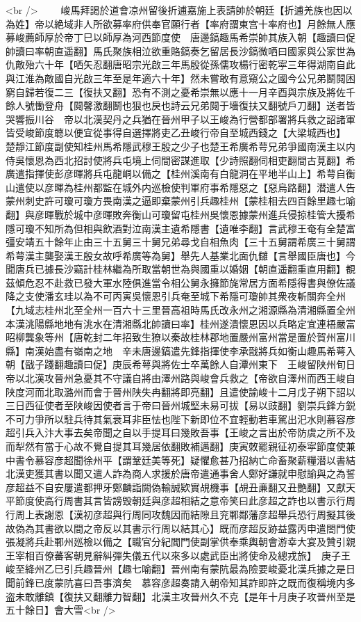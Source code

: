 <br />
　　峻馬拜謁於道會凉州留後折逋嘉施上表請帥於朝廷【折逋羌族也因以為姓】帝以絶域非人所欲募率府供奉官願行者【率府謂東宫十率府也】月餘無人應募峻薦師厚於帝丁巳以師厚為河西節度使　唐邊鎬趣馬希崇帥其族入朝【趣讀曰促帥讀曰率朝直遥翻】馬氏聚族相泣欲重賂鎬奏乞留居長沙鎬微哂曰國家與公家世為仇敵殆六十年【哂矢忍翻唐昭宗光啟三年馬殷從孫儒攻楊行密乾寜三年得湖南自此與江淮為敵國自光啟三年至是年適六十年】然未嘗敢有意窺公之國今公兄弟鬭䦧困窮自歸若復二三【復扶又翻】恐有不測之憂希崇無以應十一月辛酉與宗族及將佐千餘人號慟登舟【䦧馨激翻鬭也狠也戾也詩云兄弟䦧于墻復扶又翻號戶刀翻】送者皆哭響振川谷　帝以北漢契丹之兵猶在晉州甲子以王峻為行營都部署將兵救之詔諸軍皆受峻節度聼以便宜從事得自選擇將吏乙丑峻行帝自至城西錢之【大梁城西也】　楚靜江節度副使知桂州馬希隱武穆王殷之少子也楚王希廣希萼兄弟爭國南漢主以内侍吳懷恩為西北招討使將兵屯境上伺間密謀進取【少詩照翻伺相吏翻間古莧翻】希廣遣指揮使彭彦暉將兵屯龍峒以備之【桂州溪南有白龍洞在平地半山上】希萼自衡山遣使以彦暉為桂州都監在城外内巡檢使判軍府事希隱惡之【惡烏路翻】潜遣人告蒙州刺史許可瓊可瓊方畏南漢之逼即棄蒙州引兵趣桂州【蒙桂相去四百餘里趣七喻翻】與彦暉戰於城中彦暉敗奔衡山可瓊留屯桂州吳懷恩據蒙州進兵侵掠桂管大擾希隱可瓊不知所為但相與飲酒對泣南漢主遺希隱書【遺唯李翻】言武穆王奄有全楚富彊安靖五十餘年止由三十五舅三十舅兄弟尋戈自相魚肉【三十五舅謂希廣三十舅謂希萼漢主龑娶漢王殷女故呼希廣等為舅】舉先人基業北面仇讎【言舉國臣唐也】今聞唐兵已據長沙竊計桂林繼為所取當朝世為與國重以婚姻【朝直遥翻重直用翻】覩茲傾危忍不赴救已發大軍水陸俱進當令相公舅永擁節旄常居方面希隱得書與僚佐議降之支使潘玄珪以為不可丙寅吳懷恩引兵奄至城下希隱可瓊帥其衆夜斬關奔全州【九域志桂州北至全州一百六十三里晉高祖時馬氏改永州之湘源縣為清湘縣置全州本漢洮陽縣地地有洮水在清湘縣北帥讀曰率】桂州遂潰懷恩因以兵略定宜連梧嚴富昭柳龔象等州【唐乾封二年招致生獠以秦故桂林郡地置嚴州富州當是置於賀州富川縣】南漢始盡有嶺南之地　辛未唐邊鎬遣先鋒指揮使李承戩將兵如衡山趣馬希萼入朝【戩子踐翻趣讀曰促】庚辰希萼與將佐士卒萬餘人自潭州東下　王峻留陕州旬日帝以北漢攻晉州急憂其不守議自將由澤州路與峻會兵救之【帝欲自澤州而西王峻自陕度河而北取潞州而會于晉州陕失冉翻將即亮翻】且遣使諭峻十二月戊子朔下詔以三日西征使者至陕峻因使者言于帝曰晉州城堅未易可拔【易以豉翻】劉崇兵鋒方鋭不可力爭所以駐兵待其氣衰耳非臣怯也陛下新即位不宜輕動若車駕出汜水則慕容彦超引兵入汴大事去矣帝聞之自以手提耳曰幾敗吾事【王峻之言出於帝防虞之所不及而犁然有當于心故不覺自提其耳幾居依翻敗補邁翻】庚寅敇罷親征初泰寜節度使兼中書令慕容彦超聞徐州平【謂鞏廷美等死】疑懼愈甚乃招納亡命畜聚薪糧潜以書結北漢吏獲其書以聞又遣人詐為商人求援於唐帝遣通事舍人鄭好謙就申慰諭與之為誓彦超益不自安屢遣都押牙鄭麟詣闕偽輸誠欵實覘機事【覘丑亷翻又丑艶翻】又獻天平節度使高行周書其言皆謗毁朝廷與彦超相結之意帝笑曰此彦超之詐也以書示行周行周上表謝恩【漢初彦超與行周同攻魏因而結隙且兖鄆鄰藩彦超舉兵恐行周擬其後故偽為其書欲以間之帝反以其書示行周以結其心】既而彦超反跡益露丙申遣閤門使張凝將兵赴鄆州廵檢以備之【職官分紀閻門使副掌供奉乘輿朝會游幸大宴及贊引親王宰相百僚蕃客朝見辭糾彈失儀五代以來多以處武臣出將使命及總戎旅】　庚子王峻至絳州乙巳引兵趣晉州【趣七喻翻】晉州南有蒙阬最為險要峻憂北漢兵據之是日聞前鋒已度蒙阬喜曰吾事濟矣　慕容彦超奏請入朝帝知其詐即許之既而復稱境内多盗未敢離鎮【復扶又翻離力智翻】北漢主攻晉州久不克【是年十月庚子攻晉州至是五十餘日】會大雪<br />
